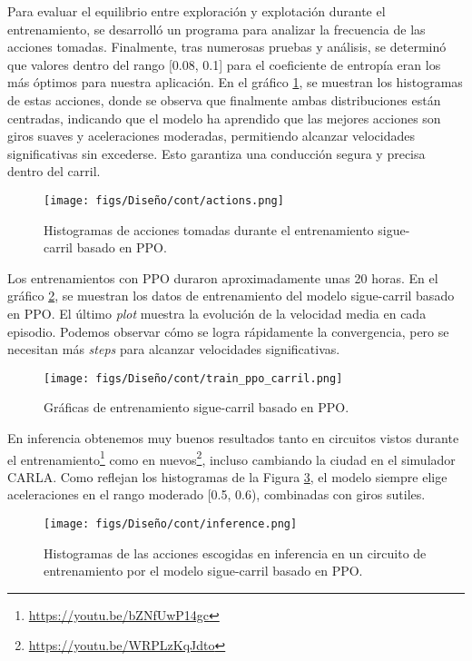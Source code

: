 Para evaluar el equilibrio entre exploración y explotación durante el entrenamiento, se desarrolló un programa para analizar la frecuencia de las acciones tomadas. Finalmente, tras numerosas pruebas y análisis, se determinó que valores dentro del rango [0.08, 0.1] para el coeficiente de entropía eran los más óptimos para nuestra aplicación. En el gráfico \ref{fig:actions_ppo_carril}, se muestran los histogramas de estas acciones, donde se observa que finalmente ambas distribuciones están centradas, indicando que el modelo ha aprendido que las mejores acciones son giros suaves y aceleraciones moderadas, permitiendo alcanzar velocidades significativas sin excederse. Esto garantiza una conducción segura y precisa dentro del carril.

\begin{figure}[ht]
  \centering
  \texttt{[image: figs/Diseño/cont/actions.png]}
  \caption{Histogramas de acciones tomadas durante el entrenamiento sigue-carril basado en \ac{PPO}.}
  \label{fig:actions_ppo_carril}
\end{figure}

\newpage

Los entrenamientos con \ac{PPO} duraron aproximadamente unas 20 horas. En el gráfico \ref{fig:train_ppo_carril}, se muestran los datos de entrenamiento del modelo sigue-carril basado en \ac{PPO}. El último \textit{plot} muestra la evolución de la velocidad media en cada episodio. Podemos observar cómo se logra rápidamente la convergencia, pero se necesitan más \textit{steps} para alcanzar velocidades significativas.
\begin{figure}[ht]
\centering
\texttt{[image: figs/Diseño/cont/train\_ppo\_carril.png]}
\caption{Gráficas de entrenamiento sigue-carril basado en \ac{PPO}.}
\label{fig:train_ppo_carril}
\end{figure}

En inferencia obtenemos muy buenos resultados tanto en circuitos vistos durante el entrenamiento\footnote{\url{https://youtu.be/bZNfUwP14gc}} como en nuevos\footnote{\url{https://youtu.be/WRPLzKqJdto}}, incluso cambiando la ciudad en el simulador CARLA. Como reflejan los histogramas de la Figura \ref{fig:inference_ppo_carril}, el modelo siempre elige aceleraciones en el rango moderado [0.5, 0.6), combinadas con giros sutiles.
\begin{figure}[ht]
\centering
\texttt{[image: figs/Diseño/cont/inference.png]}
\caption{Histogramas de las acciones escogidas en inferencia en un circuito de entrenamiento por el modelo sigue-carril basado en \ac{PPO}.}
\label{fig:inference_ppo_carril}
\end{figure} 

